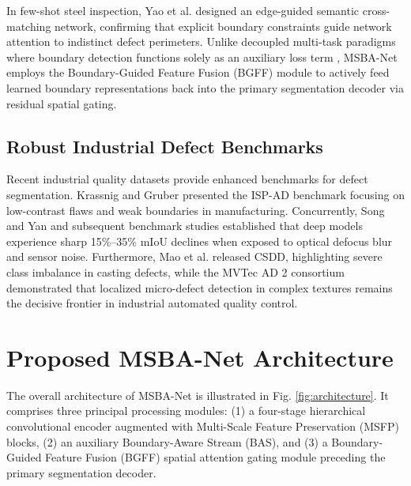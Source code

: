 \documentclass{ieeeaccess}
\begin{document}
In few-shot steel inspection, Yao et al. \cite{yao2024fewshot} designed an edge-guided semantic cross-matching network, confirming that explicit boundary constraints guide network attention to indistinct defect perimeters. Unlike decoupled multi-task paradigms where boundary detection functions solely as an auxiliary loss term \cite{kervadec2021boundary}, MSBA-Net employs the Boundary-Guided Feature Fusion (BGFF) module to actively feed learned boundary representations back into the primary segmentation decoder via residual spatial gating.

\subsection{Robust Industrial Defect Benchmarks}
Recent industrial quality datasets provide enhanced benchmarks for defect segmentation. Krassnig and Gruber \cite{krassnig2025ispad} presented the ISP-AD benchmark focusing on low-contrast flaws and weak boundaries in manufacturing. Concurrently, Song and Yan \cite{song2013neu} and subsequent benchmark studies established that deep models experience sharp 15\%--35\% mIoU declines when exposed to optical defocus blur and sensor noise. Furthermore, Mao et al. \cite{mao2025csdd} released CSDD, highlighting severe class imbalance in casting defects, while the MVTec AD 2 consortium \cite{hecklerkram2025mvtecad2} demonstrated that localized micro-defect detection in complex textures remains the decisive frontier in industrial automated quality control.

\section{Proposed MSBA-Net Architecture}
\label{sec:architecture}
The overall architecture of MSBA-Net is illustrated in Fig. \ref{fig:architecture}. It comprises three principal processing modules: (1) a four-stage hierarchical convolutional encoder augmented with Multi-Scale Feature Preservation (MSFP) blocks, (2) an auxiliary Boundary-Aware Stream (BAS), and (3) a Boundary-Guided Feature Fusion (BGFF) spatial attention gating module preceding the primary segmentation decoder.
\end{document}
